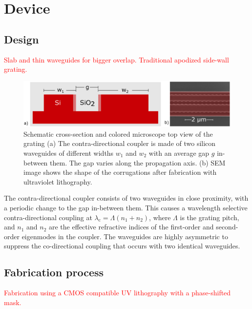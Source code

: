 \documentclass[letterpaper,10pt]{article}
\newcommand\todo[1]{\textcolor{red}{#1}}
\begin{document}
\section{Device}
\subsection{Design} 
\todo{Slab and thin waveguides for bigger overlap. Traditional apodized side-wall grating.}
\begin{figure}[htbp]
	\centering
	\includegraphics[width=.99\columnwidth]{CrossAndTop}
	\caption{Schematic cross-section and colored microscope top view of the grating (a) The contra-directional coupler is made of two silicon waveguides of different widths $w_1$ and $w_2$ with an average gap $g$ in-between them. The gap varies along the propagation axis. (b) SEM image shows the shape of the corrugations after fabrication with ultraviolet lithography. }
	\label{fig:Device}
\end{figure}

The contra-directional coupler consists of two waveguides in close proximity, with a periodic change to the gap in-between them. This causes a wavelength selective contra-directional coupling at  $\lambda_\text{c} = \Lambda (n_\text{1}+n_\text{2})$, where $\Lambda$ is the grating pitch, and $n_\text{1}$ and $n_\text{2}$ are the effective refractive indices of the first-order and second-order eigenmodes in the coupler. 
The waveguides are highly asymmetric to suppress the co-directional coupling that occurs with two identical waveguides.

\subsection{Fabrication process}
\todo{Fabrication using a CMOS compatible UV lithography with a phase-shifted mask.}
\end{document}
